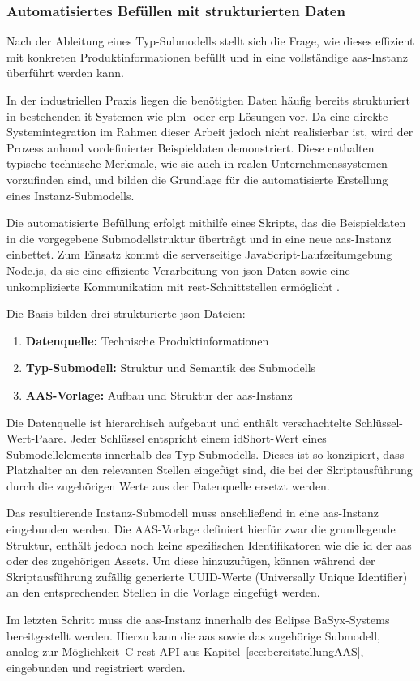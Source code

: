 \subsubsection{Automatisiertes Befüllen mit strukturierten Daten}

Nach der Ableitung eines Typ-Submodells stellt sich die Frage, wie dieses effizient mit konkreten Produktinformationen befüllt und in eine vollständige \acs{aas}-Instanz überführt werden kann.

In der industriellen Praxis liegen die benötigten Daten häufig bereits strukturiert in bestehenden \acs{it}-Systemen wie \acs{plm}- oder \acs{erp}-Lösungen vor.
Da eine direkte Systemintegration im Rahmen dieser Arbeit jedoch nicht realisierbar ist, wird der Prozess anhand vordefinierter Beispieldaten demonstriert.
Diese enthalten typische technische Merkmale, wie sie auch in realen Unternehmenssystemen vorzufinden sind, und bilden die Grundlage für die automatisierte Erstellung eines Instanz-Submodells.

Die automatisierte Befüllung erfolgt mithilfe eines Skripts, das die Beispieldaten in die vorgegebene Submodellstruktur überträgt und in eine neue \acs{aas}-Instanz einbettet.
Zum Einsatz kommt die serverseitige JavaScript-Laufzeitumgebung Node.js, da sie eine effiziente Verarbeitung von \acs{json}-Daten sowie eine unkomplizierte Kommunikation mit \acs{rest}-Schnittstellen ermöglicht \cite{nodejs}.

Die Basis bilden drei strukturierte \acs{json}-Dateien:

\begin{enumerate}[noitemsep, leftmargin=*, label=\textbf{\arabic*.}]
    \item \textbf{Datenquelle:} Technische Produktinformationen
    \item \textbf{Typ-Submodell:} Struktur und Semantik des Submodells
    \item \textbf{AAS-Vorlage:} Aufbau und Struktur der \acs{aas}-Instanz
\end{enumerate}

Die Datenquelle ist hierarchisch aufgebaut und enthält verschachtelte Schlüssel-Wert-Paare.
Jeder Schlüssel entspricht einem idShort-Wert eines Submodellelements innerhalb des Typ-Submodells.
Dieses ist so konzipiert, dass Platzhalter an den relevanten Stellen eingefügt sind, die bei der Skriptausführung durch die zugehörigen Werte aus der Datenquelle ersetzt werden.

Das resultierende Instanz-Submodell muss anschließend in eine \acs{aas}-Instanz eingebunden werden.
Die AAS-Vorlage definiert hierfür zwar die grundlegende Struktur, enthält jedoch noch keine spezifischen Identifikatoren wie die \acs{id} der \acs{aas} oder des zugehörigen Assets.
Um diese hinzuzufügen, können während der Skriptausführung zufällig generierte UUID-Werte (Universally Unique Identifier) an den entsprechenden Stellen in die Vorlage eingefügt werden.

Im letzten Schritt muss die \acs{aas}-Instanz innerhalb des Eclipse BaSyx-Systems bereitgestellt werden.
Hierzu kann die \acs{aas} sowie das zugehörige Submodell, analog zur Möglichkeit~C \acs{rest}-API aus Kapitel~\ref{sec:bereitstellungAAS}, eingebunden und registriert werden.